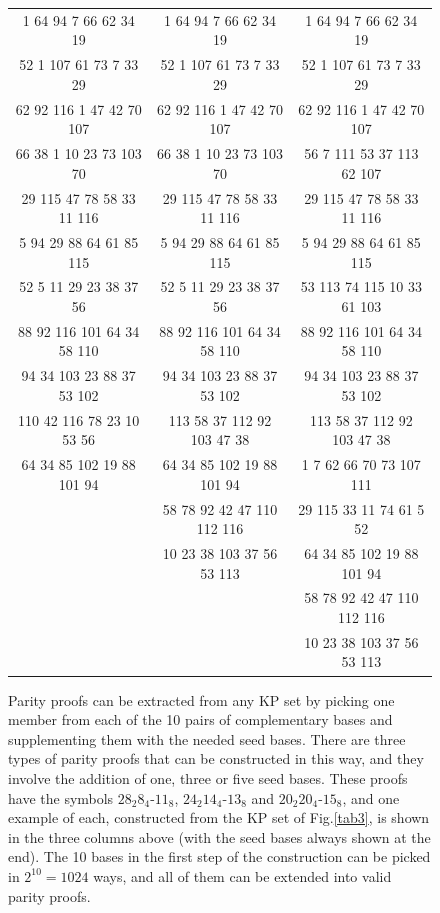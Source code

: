 \begin{figure}[ht]
\centering %
\begin{tabular}{|c | c |c |} %
\hline %
1	64	94	7	66	62	34	19   & 1 64	94	7	66	62	34	19  &  1	64	94	7	66	62	34	19 \\
52	1	107	61	73	7	33	29   &52 1	107	61	73	7	33	29  &52	1	107	61	73	7	33	29 \\
62	92	116	1	47	42	70	107  &62 92	116	1	47	42	70	107 & 62	92	116	1	47	42	70	107 \\
66	38	1	10	23	73	103	70   &66 38	1	10	23	73	103	70 &56	7	111	53	37	113	62	107 \\
29	115	47	78	58	33	11	116  &29 115 47	78	58	33	11	116 &29	115	47	78	58	33	11	116 \\
5	94	29	88	64	61	85	115  &5	94	29	88	64	61	85	115 &5	94	29	88	64	61	85	115 \\
52	5	11	29	23	38	37	56   &52 5	11	29	23	38	37	56& 53	113	74	115	10	33	61	103 \\
88	92	116	101	64	34	58	110  &88 92	116	101	64	34	58	110&88	92	116	101	64	34	58	110 \\
94	34	103	23	88	37	53	102  &94 34	103	23	88	37	53	102& 94	34	103	23	88	37	53	102 \\
110	42	116	78	23	10	53	56   &113 58	37	112	92	103	47	38& 113	58	37	112	92	103	47	38\\
64	34	85	102	19	88	101	94   &64 34	85	102	19	88	101	94& 1	7	62	66	70	73	107	111 \\
                                 &58 78	92	42	47	110	112	116&29	115	33	11	74	61	5	52 \\
                                 &10 23	38	103	37	56	53	113&64	34	85	102	19	88	101	94 \\
                                 &                             &58	78	92	42	47	110	112	116\\
                                 &                             &10	23	38	103	37	56	53	113\\
\hline
\end{tabular}
\caption{Parity proofs can be extracted from any KP set by picking one member from each of the 10 pairs of complementary bases and supplementing them with the needed seed bases. There are three types of parity proofs that can be constructed in this way, and they involve the addition of one, three or five seed bases. These proofs have the symbols $28_{2}8_{4}$-$11_{8}$, $24_{2}14_{4}$-$13_{8}$ and $20_{2}20_{4}$-$15_{8}$, and one example of each, constructed from the KP set of Fig.\ref{tab3}, is shown in the three columns above (with the seed bases always shown at the end). The 10 bases in the first step of the construction can be picked in $2^{10}=1024$ ways, and all of them can be extended into valid parity proofs.}
\label{tab3a}
\end{figure}

